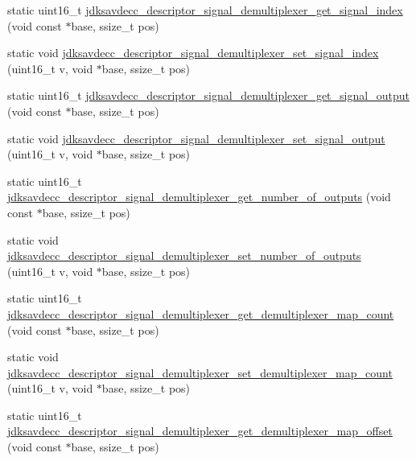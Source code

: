 \begin{DoxyCompactItemize}
static uint16\+\_\+t \hyperlink{group__descriptor__signal__demultiplexer_gac671d36e22d30c676383a69b1b99be0a}{jdksavdecc\+\_\+descriptor\+\_\+signal\+\_\+demultiplexer\+\_\+get\+\_\+signal\+\_\+index} (void const $\ast$base, ssize\+\_\+t pos)
\item 
static void \hyperlink{group__descriptor__signal__demultiplexer_ga4d86725f2692b11395791cad4f1ae8c6}{jdksavdecc\+\_\+descriptor\+\_\+signal\+\_\+demultiplexer\+\_\+set\+\_\+signal\+\_\+index} (uint16\+\_\+t v, void $\ast$base, ssize\+\_\+t pos)
\item 
static uint16\+\_\+t \hyperlink{group__descriptor__signal__demultiplexer_gacda254c08b78a4be2da6796076537d32}{jdksavdecc\+\_\+descriptor\+\_\+signal\+\_\+demultiplexer\+\_\+get\+\_\+signal\+\_\+output} (void const $\ast$base, ssize\+\_\+t pos)
\item 
static void \hyperlink{group__descriptor__signal__demultiplexer_ga1cd79217b69bd9478e7b77708a34c09a}{jdksavdecc\+\_\+descriptor\+\_\+signal\+\_\+demultiplexer\+\_\+set\+\_\+signal\+\_\+output} (uint16\+\_\+t v, void $\ast$base, ssize\+\_\+t pos)
\item 
static uint16\+\_\+t \hyperlink{group__descriptor__signal__demultiplexer_ga6b8546f095f4c033e1c8d8d80d3ec436}{jdksavdecc\+\_\+descriptor\+\_\+signal\+\_\+demultiplexer\+\_\+get\+\_\+number\+\_\+of\+\_\+outputs} (void const $\ast$base, ssize\+\_\+t pos)
\item 
static void \hyperlink{group__descriptor__signal__demultiplexer_gab7413cd1f548ab99b2c32ed05893b92b}{jdksavdecc\+\_\+descriptor\+\_\+signal\+\_\+demultiplexer\+\_\+set\+\_\+number\+\_\+of\+\_\+outputs} (uint16\+\_\+t v, void $\ast$base, ssize\+\_\+t pos)
\item 
static uint16\+\_\+t \hyperlink{group__descriptor__signal__demultiplexer_ga89ac5d307988437cb78b12890f31634d}{jdksavdecc\+\_\+descriptor\+\_\+signal\+\_\+demultiplexer\+\_\+get\+\_\+demultiplexer\+\_\+map\+\_\+count} (void const $\ast$base, ssize\+\_\+t pos)
\item 
static void \hyperlink{group__descriptor__signal__demultiplexer_gaeda002abf270e8faba453339b906743d}{jdksavdecc\+\_\+descriptor\+\_\+signal\+\_\+demultiplexer\+\_\+set\+\_\+demultiplexer\+\_\+map\+\_\+count} (uint16\+\_\+t v, void $\ast$base, ssize\+\_\+t pos)
\item 
static uint16\+\_\+t \hyperlink{group__descriptor__signal__demultiplexer_ga5d74dd31e9c5bf8c78874e7b37a9c9d6}{jdksavdecc\+\_\+descriptor\+\_\+signal\+\_\+demultiplexer\+\_\+get\+\_\+demultiplexer\+\_\+map\+\_\+offset} (void const $\ast$base, ssize\+\_\+t pos)

\end{DoxyCompactItemize}
